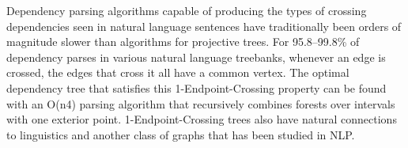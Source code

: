 Dependency parsing algorithms capable of producing the types of crossing dependencies seen in natural language sentences have traditionally been orders
 of magnitude slower than algorithms for projective trees. For 95.8--99.8\% of
 dependency parses in various natural language treebanks, whenever an edge is
 crossed, the edges that cross it all have a common vertex. The optimal
 dependency tree that satisfies this 1-Endpoint-Crossing property can be found
 with an O(n4) parsing algorithm that recursively combines forests over
 intervals with one exterior point. 1-Endpoint-Crossing trees also have natural
 connections to linguistics and another class of graphs that has been studied in
 NLP.

